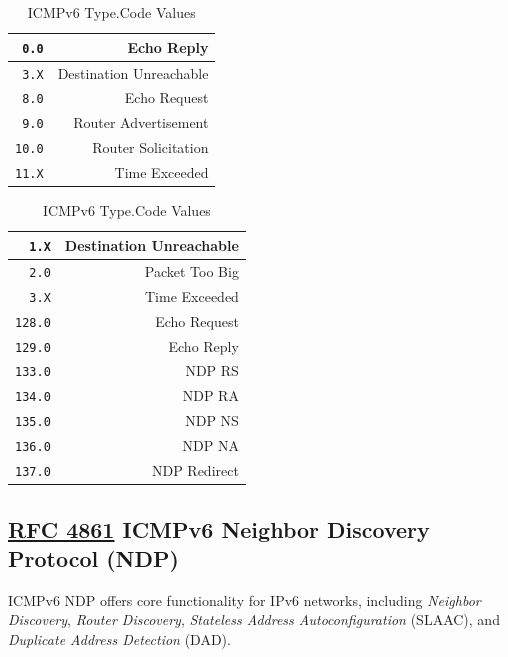 \documentclass[12pt]{article}
\newcommand{\RFC}[1]{\href{https://datatracker.ietf.org/doc/html/rfc#1}{RFC #1}}
\begin{document}
	\begin{table}[H]
	\begin{minipage}{.45\linewidth}
	\centering
	\caption{ICMP Type.Code Values \label{tab:ICMP VALUES}}
	\begin{tabular}{| r | r |}
	\hline
	\texttt{0.0}	& Echo Reply\\\hline
	\texttt{3.X} 	& Destination Unreachable\\\hline
	\texttt{8.0}	& Echo Request\\\hline
	\texttt{9.0}	& Router Advertisement\\
	\texttt{10.0}	& Router Solicitation\\\hline
	\texttt{11.X} & Time Exceeded\\\hline
	\end{tabular}\end{minipage}\hfill
	\begin{minipage}{.45\linewidth}
	\centering
	\caption{ICMPv6 Type.Code Values\label{tab:ICMPV6 VALUES}}
	\begin{tabular}{| r | r |}
	\hline
	\texttt{1.X}	 	& Destination Unreachable\\\hline
	\texttt{2.0}		& Packet Too Big\\\hline
	\texttt{3.X}	 	& Time Exceeded\\\hline
	\texttt{128.0}	& Echo Request\\
	\texttt{129.0}	& Echo Reply\\\hline
	\texttt{133.0}	& NDP RS\\
	\texttt{134.0}	& NDP RA\\
	\texttt{135.0}	& NDP NS\\
	\texttt{136.0}	& NDP NA\\
	\texttt{137.0}	& NDP Redirect\\\hline
	\end{tabular}\end{minipage}\end{table}


	\subsection[RFC 4861 ICMPv6 NDP]{\RFC{4861} ICMPv6 Neighbor Discovery Protocol (NDP) \label{subsec:NDP}}
	ICMPv6 NDP offers core functionality for IPv6 networks, including \textit{Neighbor Discovery}, \textit{Router Discovery}, \textit{Stateless Address Autoconfiguration} (SLAAC), and \textit{Duplicate Address Detection} (DAD).
\end{document}
